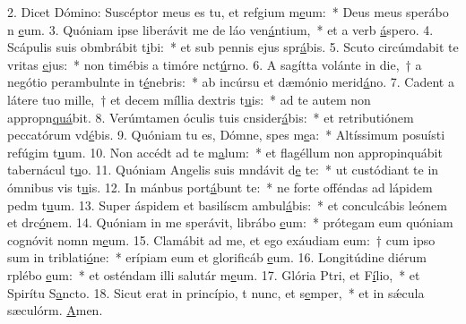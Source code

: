 2. Dicet Dómino: Suscéptor meus es tu, et refgium m\uline{e}um:~* Deus meus sperábo n \uline{e}um.
3. Quóniam ipse liberávit me de láo ven\uline{á}ntium,~* et a verb \uline{á}spero.
4. Scápulis suis obmbrábit t\uline{i}bi:~* et sub pennis ejus spr\uline{á}bis.
5. Scuto circúmdabit te vritas \uline{e}jus:~* non timébis a timóre nct\uline{ú}rno.
6. A sagítta volánte in die,~† a negótio perambulnte in t\uline{é}nebris:~* ab incúrsu et dæmónio merid\uline{á}no.
7. Cadent a látere tuo mille,~† et decem míllia  dextris t\uline{u}is:~* ad te autem non appropn\uline{quá}bit.
8. Verúmtamen óculis tuis cnsider\uline{á}bis:~* et retributiónem peccatórum vd\uline{é}bis.
9. Quóniam tu es, Dómne, spes m\uline{e}a:~* Altíssimum posuísti refúgim t\uline{u}um.
10. Non accédt ad te m\uline{a}lum:~* et flagéllum non appropinquábit tabernácul t\uline{u}o.
11. Quóniam Angelis suis mndávit d\uline{e} te:~* ut custódiant te in ómnibus vis t\uline{u}is.
12. In mánbus port\uline{á}bunt te:~* ne forte offéndas ad lápidem pedm t\uline{u}um.
13. Super áspidem et basilíscm ambul\uline{á}bis:~* et conculcábis leónem et drc\uline{ó}nem.
14. Quóniam in me sperávit, librábo \uline{e}um:~* prótegam eum quóniam cognóvit nomn m\uline{e}um.
15. Clamábit ad me, et ego exáudiam eum:~† cum ipso sum in triblati\uline{ó}ne:~* erípiam eum et glorificáb \uline{e}um.
16. Longitúdine diérum rplébo \uline{e}um:~* et osténdam illi salutár m\uline{e}um.
17. Glória Ptri, et F\uline{í}lio,~* et Spirítu S\uline{a}ncto.
18. Sicut erat in princípio, t nunc, et s\uline{e}mper,~* et in sǽcula sæculórm. \uline{A}men.
